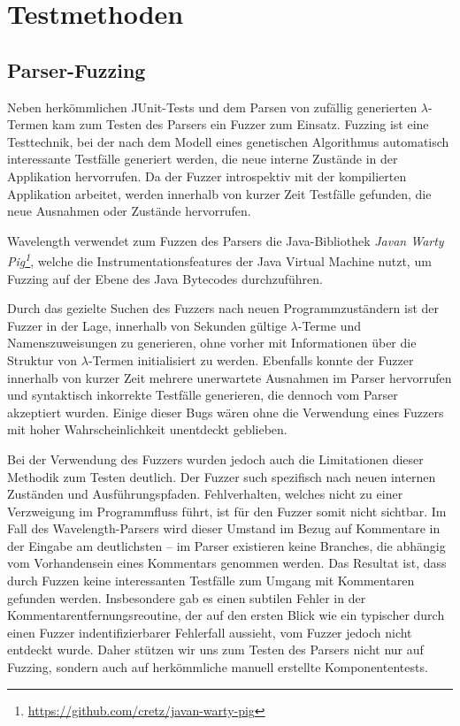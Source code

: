 \documentclass[parskip=full,11pt,openany]{scrreprt}
\begin{document}
\chapter{Testmethoden}

\section{Parser-Fuzzing}
Neben herkömmlichen JUnit-Tests und dem Parsen von zufällig generierten
$\lambda$-Termen kam zum Testen des Parsers ein Fuzzer zum Einsatz. Fuzzing ist
eine Testtechnik, bei der nach dem Modell eines genetischen Algorithmus
automatisch interessante Testfälle generiert werden, die neue interne Zustände
in der Applikation hervorrufen. Da der Fuzzer introspektiv mit der kompilierten
Applikation arbeitet, werden innerhalb von kurzer Zeit Testfälle gefunden, die
neue Ausnahmen oder Zustände hervorrufen.

Wavelength verwendet zum Fuzzen des Parsers die Java-Bibliothek
\textit{Javan Warty Pig\footnote{\url{https://github.com/cretz/javan-warty-pig}}},
welche die Instrumentationsfeatures der Java Virtual Machine nutzt, um Fuzzing
auf der Ebene des Java Bytecodes durchzuführen.

Durch das gezielte Suchen des Fuzzers nach neuen Programmzuständern ist der
Fuzzer in der Lage, innerhalb von Sekunden gültige $\lambda$-Terme und
Namenszuweisungen zu generieren, ohne vorher mit Informationen über die Struktur
von $\lambda$-Termen initialisiert zu werden. Ebenfalls konnte der Fuzzer innerhalb
von kurzer Zeit mehrere unerwartete Ausnahmen im Parser hervorrufen und syntaktisch
inkorrekte Testfälle generieren, die dennoch vom Parser akzeptiert wurden. Einige
dieser Bugs wären ohne die Verwendung eines Fuzzers mit hoher Wahrscheinlichkeit
unentdeckt geblieben.

Bei der Verwendung des Fuzzers wurden jedoch auch die Limitationen dieser Methodik
zum Testen deutlich. Der Fuzzer such spezifisch nach neuen internen Zuständen und
Ausführungspfaden. Fehlverhalten, welches nicht zu einer Verzweigung im
Programmfluss führt, ist für den Fuzzer somit nicht sichtbar. Im Fall des
Wavelength-Parsers wird dieser Umstand im Bezug auf Kommentare in der Eingabe
am deutlichsten -- im Parser existieren keine Branches, die abhängig vom
Vorhandensein eines Kommentars genommen werden. Das Resultat ist, dass durch
Fuzzen keine interessanten Testfälle zum Umgang mit Kommentaren gefunden werden.
Insbesondere gab es einen subtilen Fehler in der Kommentarentfernungsreoutine,
der auf den ersten Blick wie ein typischer durch einen Fuzzer indentifizierbarer
Fehlerfall aussieht, vom Fuzzer jedoch nicht entdeckt wurde. Daher stützen wir
uns zum Testen des Parsers nicht nur auf Fuzzing, sondern auch auf herkömmliche
manuell erstellte Komponententests.
\end{document}
